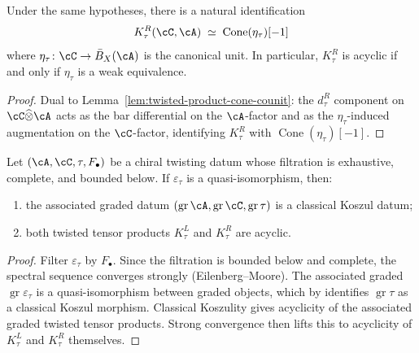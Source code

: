 \begin{lemma}
\label{lem:twisted-product-cone-unit}
Under the same hypotheses, there is a natural identification
\[
K_\tau^R(\cC,\cA) \;\simeq\; \operatorname{Cone}(\eta_\tau)[-1]
\]
where $\eta_\tau\colon \cC \to \bar{B}_X(\cA)$ is the canonical
unit.  In particular, $K_\tau^R$ is acyclic if and only if
$\eta_\tau$ is a weak equivalence.
\end{lemma}

\begin{proof}
Dual to Lemma~\ref{lem:twisted-product-cone-counit}: the
$d_\tau^R$ component on $\cC \widehat{\otimes} \cA$ acts as the
bar differential on the $\cA$-factor and as the
$\eta_\tau$-induced augmentation on the $\cC$-factor, identifying
$K_\tau^R$ with $\operatorname{Cone}(\eta_\tau)[-1]$.
\end{proof}

\begin{lemma}
\label{lem:filtered-comparison}
Let $(\cA, \cC, \tau, F_\bullet)$ be a chiral twisting datum
whose filtration is exhaustive, complete, and bounded below.
If $\varepsilon_\tau$ is a quasi-isomorphism, then:
\begin{enumerate}[label=\textup{(\alph*)}]
\item the associated graded datum
  $(\operatorname{gr} \cA, \operatorname{gr} \cC,
  \operatorname{gr} \tau)$ is a classical Koszul datum;
\item both twisted tensor products $K_\tau^L$ and $K_\tau^R$ are
  acyclic.
\end{enumerate}
\end{lemma}

\begin{proof}
Filter $\varepsilon_\tau$ by $F_\bullet$.  Since the filtration
is bounded below and complete, the spectral sequence converges
strongly (Eilenberg--Moore).  The associated graded
$\operatorname{gr} \varepsilon_\tau$ is a quasi-isomorphism
between graded objects, which by \cite[Theorem~3.2.1]{LV12}
identifies $\operatorname{gr} \tau$ as a classical Koszul
morphism.  Classical Koszulity gives acyclicity of the
associated graded twisted tensor products.  Strong convergence
then lifts this to acyclicity of $K_\tau^L$ and $K_\tau^R$
themselves.
\end{proof}

